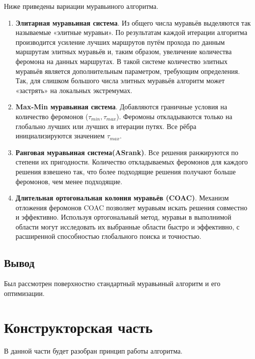 \documentclass[a4paper, 14pt]{article}
\begin{document}
Ниже приведены вариации муравьиного алгоритма.
\begin{enumerate}
\item \textbf{Элитарная муравьиная система}.
Из общего числа муравьёв выделяются так называемые «элитные муравьи». По результатам каждой итерации алгоритма производится усиление лучших маршрутов путём прохода по данным маршрутам элитных муравьёв и, таким образом, увеличение количества феромона на данных маршрутах. В такой системе количество элитных муравьёв является дополнительным параметром, требующим определения. Так, для слишком большого числа элитных муравьёв алгоритм может «застрять» на локальных экстремумах.
\item \textbf{Max-Min муравьиная система}.
Добавляются граничные условия на количество феромонов 
($\tau _{min}, \tau _{max}$). Феромоны откладываются только на глобально лучших или лучших в итерации путях. Все рёбра инициализируются значением $\tau _{max}$.
\item \textbf{Ранговая муравьиная система(ASrank)}.
Все решения ранжируются по степени их пригодности. Количество откладываемых феромонов для каждого решения взвешено так, что более подходящие решения получают больше феромонов, чем менее подходящие.
\item \textbf{Длительная ортогональная колония муравьёв (COAC)}.
Механизм отложения феромонов COAC позволяет муравьям искать решения совместно и эффективно. Используя ортогональный метод, муравьи в выполнимой области могут исследовать их выбранные области быстро и эффективно, с расширенной способностью глобального поиска и точностью.
\end{enumerate}

	\subsection{Вывод}
	Был рассмотрен поверхностно стандартный муравьиный алгоритм и его оптимизации. 
	
	\newpage
	\section{Конструкторская часть}
	
	В данной части будет разобран принцип работы алгоритма.
	
\end{document}
